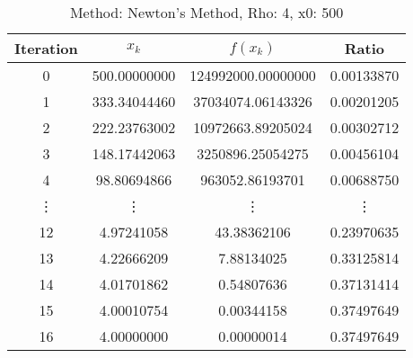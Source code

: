 \begin{table}
\centering
\caption{Method: Newton's Method, Rho: 4, x0: 500}
\label{tab:table_Newton's_Method_4_500}
\begin{tabular}{c c c c}
\toprule
Iteration &        $x_k$ &           $f(x_k)$ &      Ratio \\
\midrule
        0 & 500.00000000 & 124992000.00000000 & 0.00133870 \\
        1 & 333.34044460 &  37034074.06143326 & 0.00201205 \\
        2 & 222.23763002 &  10972663.89205024 & 0.00302712 \\
        3 & 148.17442063 &   3250896.25054275 & 0.00456104 \\
        4 &  98.80694866 &    963052.86193701 & 0.00688750 \\
   \vdots &       \vdots &             \vdots &     \vdots \\
       12 &   4.97241058 &        43.38362106 & 0.23970635 \\
       13 &   4.22666209 &         7.88134025 & 0.33125814 \\
       14 &   4.01701862 &         0.54807636 & 0.37131414 \\
       15 &   4.00010754 &         0.00344158 & 0.37497649 \\
       16 &   4.00000000 &         0.00000014 & 0.37497649 \\
\bottomrule
\end{tabular}
\end{table}
